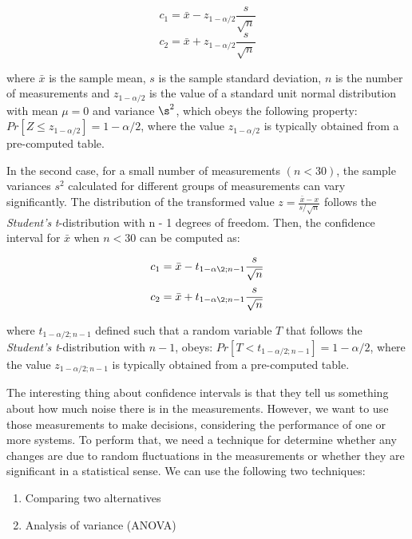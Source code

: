 \documentclass{latex/classes/thesis}
\begin{document}
\begin{equation}
c_1 = \bar{x} - z_{1 - \alpha/2}\frac{s}{\sqrt{n}}
\end{equation}
\begin{equation}
c_2 = \bar{x} + z_{1 - \alpha/2}\frac{s}{\sqrt{n}}
\end{equation}

where \(\bar{x}\) is the sample mean, \(s\) is the sample standard deviation,
\(n\) is the number of measurements and \(z_{1 - \alpha/2}\) is the value of
a standard unit normal distribution with mean \(\mu = 0\) and variance
\(\s^2\), which obeys the following property: \(Pr[Z \le z_{1-\alpha/2}] =
   1 - \alpha/2\), where the value \(z_{1 - \alpha/2}\) is typically obtained
from a pre-computed table.

In the second case, for a small number of measurements \((n < 30)\), the
sample variances \(s^2\) calculated for different groups of measurements can
vary significantly. The distribution of the transformed value \(z =
   \frac{\bar{x} - x}{s/\sqrt{n}}\) follows the \emph{Student's} \emph{t}-distribution
with n - 1 degrees of freedom. Then, the confidence interval for \(\bar{x}\)
when \(n < 30\) can be computed as:

\begin{equation}
c_1 = \bar{x} - t_{1-\alpha\2;n-1}\frac{s}{\sqrt{n}}
\end{equation}
\begin{equation}
c_2 = \bar{x} + t_{1-\alpha\2;n-1}\frac{s}{\sqrt{n}}
\end{equation}

where \(t_{1 - \alpha/2;n-1}\) defined such that a random variable \(T\) that
follows the \emph{Student's t}-distribution with \(n - 1\), obeys: \(Pr[T < t_{1 -
   \alpha/2;n - 1}] = 1 - \alpha/2\), where the value \(z_{1 - \alpha/2;n - 1}\)
is typically obtained from a pre-computed table.

The interesting thing about confidence intervals is that they tell us
something about how much noise there is in the measurements. However, we want
to use those measurements to make decisions, considering the performance of
one or more systems. To perform that, we need a technique for determine
whether any changes are due to random fluctuations in the measurements or
whether they are significant in a statistical sense. We can use the following
two techniques:

\begin{enumerate}
\item Comparing two alternatives
\item Analysis of variance (ANOVA)
\end{enumerate}
\end{document}
